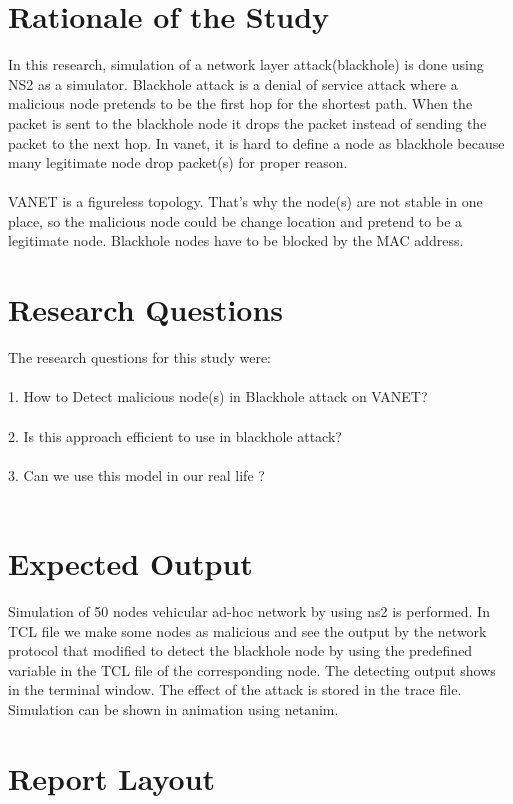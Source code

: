 \section{Rationale of the Study}

In this research, simulation of a network layer attack(blackhole) is done using NS2 as a simulator.
Blackhole attack is a denial of service attack where a malicious node pretends to be the first
hop for the shortest path. When the packet is sent to the blackhole node it drops the packet
instead of sending the packet to the next hop. In vanet, it is hard to define a node as blackhole
because many legitimate node drop packet(s) for proper reason.\\\\ VANET is a figureless topology.
That's why the node(s) are not stable in one place, so the malicious node could be change location and pretend to be a legitimate node. Blackhole nodes have to be blocked by the MAC address.


\section{Research Questions}
The research questions for this study were:\\\\
1. How to Detect malicious node(s) in Blackhole attack on VANET?\\\\
2. Is this approach efficient to use in blackhole attack?\\\\
3. Can we use this model in our real life ?\\\\


\section{Expected Output}

Simulation of 50 nodes vehicular ad-hoc network by using ns2 is performed.
In TCL file we make some nodes as malicious and see the output by the network protocol that modified to detect the blackhole node by using the predefined variable in the TCL file of the corresponding node. The detecting output shows in the terminal window. The effect of the attack is stored in the trace file. Simulation can be shown in animation using netanim.
\section{Report Layout}

